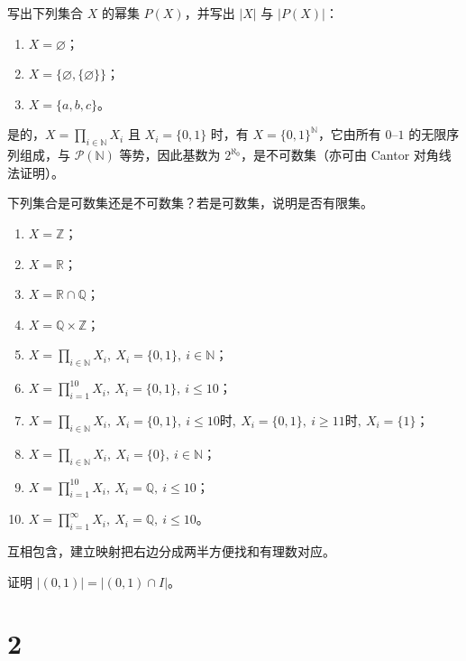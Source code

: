 \begin{homework}[1.17]
写出下列集合 $X$ 的幂集 $P(X)$，并写出 $|X|$ 与 $|P(X)|$：
\begin{enumerate}[(1)]
  \item $X = \varnothing$；
  \item $X = \{\varnothing, \{\varnothing\}\}$；
  \item $X = \{a,b,c\}$。
\end{enumerate}
\end{homework}
\begin{dxtips}
    是的，$X=\prod_{i\in\mathbb{N}}X_i$ 且 $X_i=\{0,1\}$ 时，有 $X=\{0,1\}^{\mathbb{N}}$，它由所有 $0$--$1$ 的无限序列组成，与 $\mathcal{P}(\mathbb{N})$ 等势，因此基数为 $2^{\aleph_0}$，是不可数集（亦可由 Cantor 对角线法证明）。
\end{dxtips}
\begin{homework}[1.18]
下列集合是可数集还是不可数集？若是可数集，说明是否有限集。
\begin{enumerate}[(1)]
  \item $X = \mathbb{Z}$；
  \item $X = \mathbb{R}$；
  \item $X = \mathbb{R}\cap \mathbb{Q}$；
  \item $X = \mathbb{Q}\times \mathbb{Z}$；
  \item $X = \prod_{i\in\mathbb{N}} X_i, \ X_i=\{0,1\},\ i\in\mathbb{N}$；
  \item $X = \prod_{i=1}^{10} X_i, \ X_i=\{0,1\},\ i\leq 10$；
  \item $X = \prod_{i\in\mathbb{N}} X_i, \ X_i=\{0,1\},\ i\leq 10 \text{时},\ X_i=\{0,1\},\ i\geq 11 \text{时},\ X_i=\{1\}$；
  \item $X = \prod_{i\in\mathbb{N}} X_i, \ X_i=\{0\},\ i\in\mathbb{N}$；
  \item $X = \prod_{i=1}^{10} X_i, \ X_i=\mathbb{Q},\ i\leq 10$；
  \item $X = \prod_{i=1}^{\infty} X_i, \ X_i=\mathbb{Q},\ i\leq 10$。
\end{enumerate}
\end{homework}
\begin{dxtips}
    互相包含，建立映射把右边分成两半方便找和有理数对应。
\end{dxtips}
\begin{homework}[1.19]
证明 $|(0,1)| = |(0,1)\cap I|$。
\end{homework}
\chapter{2}

